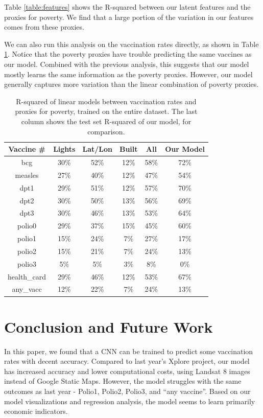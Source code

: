 \documentclass[]{article}
\begin{document}
Table \ref{table:features} shows the R-squared between our latent features and the proxies for poverty. We find that a large portion of the variation in our features comes from these proxies.

We can also run this analysis on the vaccination rates directly, as shown in Table \ref{table:vaccines}. Notice that the poverty proxies have trouble predicting the same vaccines as our model. Combined with the previous analysis, this suggests that our model mostly learns the same information as the poverty proxies. However, our model generally captures more variation than the linear combination of poverty proxies.

\begin{table}[t]
\centering
\begin{tabular}{c|cccc|c}
\hline
Vaccine \# & Lights & Lat/Lon & Built & All & Our Model \\
\hline
bcg&30\%&52\%&12\%&58\%&72\%\\
measles&27\%&40\%&12\%&47\%&54\%\\
dpt1&29\%&51\%&12\%&57\%&70\%\\
dpt2&30\%&50\%&13\%&56\%&69\%\\
dpt3&30\%&46\%&13\%&53\%&64\%\\
polio0&29\%&37\%&15\%&45\%&60\%\\
polio1&15\%&24\%&7\%&27\%&17\%\\
polio2&15\%&21\%&7\%&24\%&13\%\\
polio3&5\%&5\%&3\%&8\%&0\%\\
health\_card&29\%&46\%&12\%&53\%&67\%\\
any\_vacc&12\%&22\%&7\%&24\%&13\%\\
\hline
\end{tabular}
\caption{R-squared of linear models between vaccination rates and proxies for poverty, trained on the entire dataset. The last column shows the test set R-squared of our model, for comparison.}
\label{table:vaccines}
\end{table}

\section{Conclusion and Future Work}
In this paper, we found that a CNN can be trained to predict some vaccination rates with decent accuracy. Compared to last year's Xplore project, our model has increased accuracy and lower computational costs, using Landsat 8 images instead of Google Static Maps. However, the model struggles with the same outcomes as last year - Polio1, Polio2, Polio3, and ``any vaccine''. Based on our model visualizations and regression analysis, the model seems to learn primarily economic indicators. 
\end{document}
